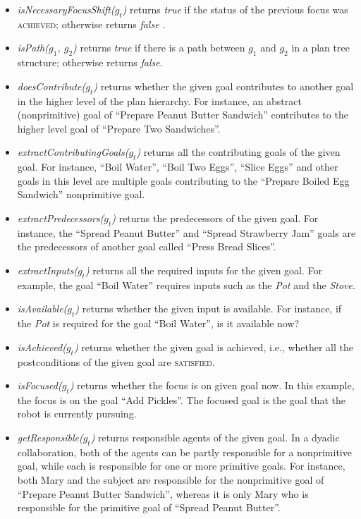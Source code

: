 \documentclass{article}
\begin{document}
\begin{itemize}[leftmargin=2pt]
  \item \textit{isNecessaryFocusShift($g_t$)} returns \textit{true} if the
  status of the previous focus was \textsc{achieved}; otherwise returns
  \textit{false} \cite{rich:focused-unfocused-users}.
  
  \item \textit{isPath($g_1$, $g_2$)} returns \textit{true} if there is a path
  between $g_1$ and $g_2$ in a plan tree structure; otherwise returns
  \textit{false}.
  
  \item \textit{doesContribute($g_t$)} returns whether the given goal
  contributes to another goal in the higher level of the plan hierarchy. For
  instance, an abstract (nonprimitive) goal of ``Prepare Peanut Butter
  Sandwich'' contributes to the higher level goal of ``Prepare Two Sandwiches''.
  
  \item \textit{extractContributingGoals($g_t$)} returns all the contributing
  goals of the given goal. For instance, ``Boil Water'', ``Boil Two Eggs'',
  ``Slice Eggs'' and other goals in this level are multiple goals contributing
  to the ``Prepare Boiled Egg Sandwich'' nonprimitive goal.
  
  \item \textit{extractPredecessors($g_t$)} returns the predecessors of the
  given goal. For instance, the ``Spread Peanut Butter'' and ``Spread
  Strawberry Jam'' goals are the predecessors of another goal called ``Press
  Bread Slices''.
  
  \item \textit{extractInputs($g_t$)} returns all the required inputs for
  the given goal. For example, the goal ``Boil Water'' requires inputs such as
  the \textit{Pot} and the \textit{Stove}.
  
  \item \textit{isAvailable($g_t$)} returns whether the given input is
  available. For instance, if the \textit{Pot} is required for the goal
  ``Boil Water'', is it available now?
  
  \item \textit{isAchieved($g_t$)} returns whether the given goal is achieved,
  i.e., whether all the postconditions of the given goal are \textsc{satisfied}.
  
  \item \textit{isFocused($g_t$)} returns whether the focus is on given
  goal now. In this example, the focus is on the goal ``Add Pickles''. The
  focused goal is the goal that the robot is currently pursuing.
  
  \item \textit{getResponsible($g_t$)} returns responsible agents of the given
  goal. In a dyadic collaboration, both of the agents can be partly responsible
  for a nonprimitive goal, while each is responsible for one or more primitive
  goals. For instance, both Mary and the subject are responsible for the
  nonprimitive goal of ``Prepare Peanut Butter Sandwich'', whereas it is only
  Mary who is responsible for the primitive goal of ``Spread Peanut Butter''.
\end{itemize}
\end{document}
